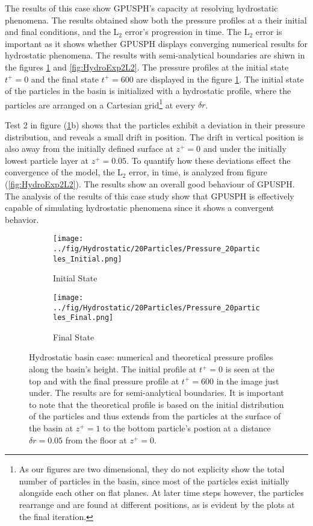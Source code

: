 \documentclass{../GPUSPHtemplate}
\begin{document}
The results of this case show GPUSPH's capacity at resolving hydrostatic phenomena. The results obtained show
both the pressure profiles at a their initial and final conditions, and the L$_2$ error's progression in time.
The L$_2$ error is important as it shows whether
GPUSPH displays converging numerical results for hydrostatic phenomena.
The results with semi-analytical boundaries are shiwn in the figures \ref{fig:HydroExp2} and \ref{fig:HydroExp2L2}.
The pressure profiles at the initial state $t^+=0$ and the final state $t^+=600$ are displayed in the figure \ref{fig:HydroExp2}.
The initial state of the particles in the basin is initialized with a hydrostatic profile, where the particles are arranged
on a Cartesian grid\footnote{As our figures are two dimensional, they do not explicity show the total
  number of particles in the basin, since most of the particles exist initially alongside each other on flat planes.
  At later time steps however, the particles rearrange and are found at different positions, as is evident
  by the plots at the final iteration.} at every $\delta r$.

Test 2 in figure (\ref{fig:HydroExp2}b) shows that the particles exhibit a deviation
in their pressure distribution, and reveals a small drift in position. The drift in vertical position
is also away from the initially defined surface at $z^+=0$ and under the initially lowest particle layer
at $z^+=0.05$. To quantify how these deviations effect the convergence of the model, the L$_2$ error, in time,
is analyzed from figure (\ref{fig:HydroExp2L2}). The results show an overall good behaviour of GPUSPH.\\

The analysis of the results of this case study show that GPUSPH is effectively capable of simulating
hydrostatic phenomena since it shows a convergent behavior. 
\vfill

\begin{figure}[H]
  \begin{subfigure}{.5\textwidth}
    \centering
    \texttt{[image: ../fig/Hydrostatic/20Particles/Pressure\_20particles\_Initial.png]}
    \vspace*{5pt}
    \caption{Initial State}
  \end{subfigure}%
  \begin{subfigure}{.5\textwidth}
    \centering 
    \texttt{[image: ../fig/Hydrostatic/20Particles/Pressure\_20particles\_Final.png]}
    \caption{Final State}        
  \end{subfigure}
  \caption{Hydrostatic basin case: numerical and theoretical pressure profiles along the basin's height.
    The initial profile at $t^+=0$ is seen at the top and with the final pressure profile at $t^+=600$ in the image just under.
    The results are for semi-analytical boundaries. It is important to note that the theoretical profile is
    based on the initial distribution of the particles and thus extends from the particles at the surface of the
    basin at $z^+=1$ to the bottom particle's postion at a distance $\delta r = 0.05 $ from the floor at $z^+=0$. }
  \label{fig:HydroExp2}
\end{figure}
\end{document}
